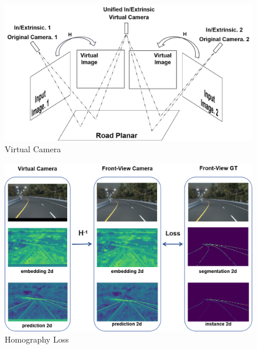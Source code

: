 \begin{figure}[!ht]
    \centering
    \includegraphics[width=\linewidth]{asset/virtual_camera}
    \caption{Virtual Camera}
    \label{fig:Virtual Camera}
\end{figure}

\begin{figure}[!ht]
    \centering
    \includegraphics[height=0.45\textheight]{asset/loss2}
    \caption{Homography Loss}
    \label{fig:Homography Loss}
\end{figure}

